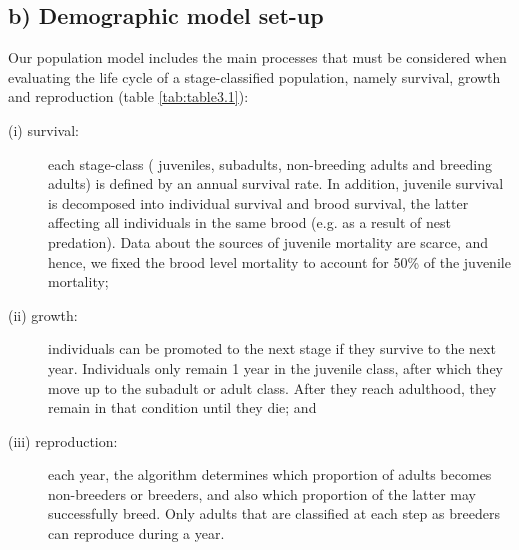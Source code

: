 \subsection*{b) Demographic model set-up}

Our population model includes the main processes that must be
considered when evaluating the life cycle of a stage-classified
population, namely survival, growth and reproduction (table \ref{tab:table3.1}):
\begin{description}
  \item[(i) survival:] each stage-class ( juveniles, subadults, non-breeding
    adults and breeding adults) is defined by an annual
    survival rate. In addition, juvenile survival is decomposed
    into individual survival and brood survival, the latter
    affecting all individuals in the same brood (e.g. as a
    result of nest predation). Data about the sources of juvenile
    mortality are scarce, and hence, we fixed the brood level
    mortality to account for 50\% of the juvenile mortality;
  \item[(ii) growth:] individuals can be promoted to the next stage if
    they survive to the next year. Individuals only remain
    1 year in the juvenile class, after which they move up
    to the subadult or adult class. After they reach adulthood,
    they remain in that condition until they die; and
  \item[(iii) reproduction:] each year, the algorithm determines
    which proportion of adults becomes non-breeders or
    breeders, and also which proportion of the latter
    may successfully breed. Only adults that are classified
    at each step as breeders can reproduce during a year.
\end{description}


